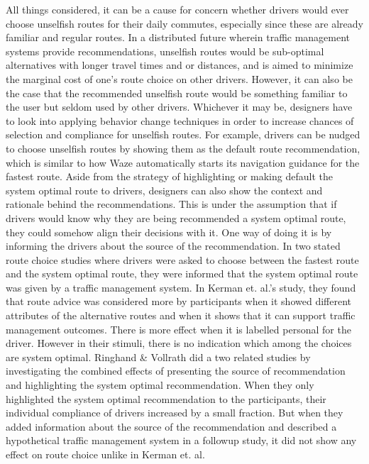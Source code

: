 All things considered, it can be a cause for concern whether drivers would ever choose unselfish routes for their daily commutes, especially since these are already familiar and regular routes. In a distributed future wherein traffic management systems provide recommendations, unselfish routes would be sub-optimal alternatives with longer travel times and or distances\cite{ringhand2018make}, and is aimed to minimize the marginal cost of one's route choice on other drivers\cite{colak2016understanding}. However, it can also be the case that the recommended unselfish route would be something familiar to the user but seldom used by other drivers. Whichever it may be, designers have to look into applying behavior change techniques in order to increase chances of selection and compliance for unselfish routes. For example, drivers can be nudged to choose unselfish routes by showing them as the default route recommendation, which is similar to how Waze automatically starts its navigation guidance for the fastest route\cite{avineri2009nudging}. Aside from the strategy of highlighting or making default the system optimal route to drivers, designers can also show the context and rationale behind the recommendations. This is under the assumption that if drivers would know why they are being recommended a system optimal route, they could somehow align their decisions with it. One way of doing it is by informing the drivers about the source of the recommendation. In two stated route choice studies where drivers were asked to choose between the fastest route and the system optimal route, they were informed that the system optimal route was given by a traffic management system\cite{kerkman2012car,ringhand2018make}. In Kerman et. al.'s study, they found that route advice was considered more by participants when it showed different attributes of the alternative routes and when it shows that it can support traffic management outcomes. There is more effect when it is labelled personal for the driver. However in their stimuli, there is no indication which among the choices are system optimal. Ringhand \& Vollrath did a two related studies by investigating the combined effects of presenting the source of recommendation and highlighting the system optimal recommendation\cite{ringhand2018make}. When they only highlighted the system optimal recommendation to the participants, their individual compliance of drivers increased by a small fraction. But when they added information about the source of the recommendation and described a hypothetical traffic management system in a followup study, it did not show any effect on route choice unlike in Kerman et. al.   

